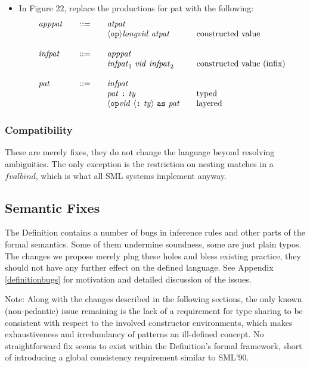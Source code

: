 \documentclass[twoside,titlepage]{article}
\begin{document}
\begin{appendix}
\begin{itemize}
\item In Figure 22, replace the productions for pat with the following: 
  $$
  \begin{array}{l@{\qquad}l@{\qquad}l@{\qquad}l}
  \mathit{apppat} & ::= & \mathit{atpat} \\
  && \langle{\tt{op}}\rangle\mathit{longvid}~\mathit{atpat} & \textrm{constructed value} \\
  \\
  \mathit{infpat} & ::= & \mathit{apppat} \\
  && \mathit{infpat}_1~\mathit{vid}~\mathit{infpat}_2 & \textrm{constructed value (infix)} \\
  \\
  \mathit{pat} & ::= & \mathit{infpat} \\
  && \mathit{pat}~\mbox{\tt:}~\mathit{ty} & \textrm{typed} \\
  && \langle{\tt{op}}\mathit{vid}~\langle\mbox{\tt:}~\mathit{ty}\rangle~{\tt{as}}~\mathit{pat} & \textrm{layered}
  \end{array}
  $$
\end{itemize}

\subsubsection*{Compatibility}

These are merely fixes, they do not change the language beyond resolving ambiguities. The only exception is the restriction on nesting matches in a $\mathit{fvalbind}$, which is what all SML systems implement anyway.


\subsection{Semantic Fixes}
\label{ext-semanticfixes}

The Definition contains a number of bugs in inference rules and other parts of the formal semantics. Some of them undermine soundness, some are just plain typos. The changes we propose merely plug these holes and bless existing practice, they should not have any further effect on the defined language. See Appendix \ref{definitionbugs} for motivation and detailed discussion of the issues.

Note: Along with the changes described in the following sections, the only known (non-pedantic) issue remaining is the lack of a requirement for type sharing to be consistent with respect to the involved constructor environments, which makes exhaustiveness and irredundancy of patterns an ill-defined concept. No straightforward fix seems to exist within the Definition's formal framework, short of introducing a global consistency requirement similar to SML'90.


\end{appendix}
\end{document}
